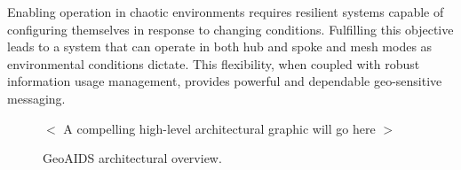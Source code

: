 \documentclass{sbir}
\begin{document}
Enabling operation in chaotic environments requires resilient systems capable of configuring themselves in response to changing conditions.  Fulfilling this objective leads to a system that can operate in both hub and spoke and mesh modes as environmental conditions dictate.  This flexibility, when coupled with robust information usage management, provides powerful and dependable geo-sensitive messaging.




\begin{figure}
 \vspace{1in}
 \begin{center}
  $<$ A compelling high-level architectural graphic will go here $>$
  \end{center}
 \vspace{1in}
  \caption{GeoAIDS architectural overview.}\label{GeoAIDarch}
 \end{figure}
\end{document}

